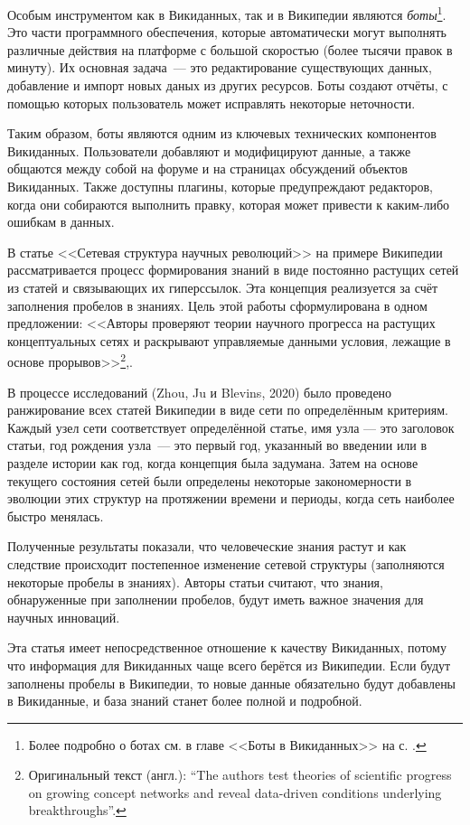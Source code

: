 Особым инструментом как в Викиданных, так и в Википедии являются \textit{боты}\footnote{Более подробно о ботах см. в главе <<Боты в Викиданных>> на с. \pageref{ch:bots}.}. Это части программного обеспечения, которые автоматически могут выполнять различные действия на платформе с большой скоростью (более тысячи правок в минуту). Их основная задача~--- это редактирование существующих данных, добавление и импорт новых даных из других ресурсов. Боты создают отчёты, с помощью которых пользователь может исправлять некоторые неточности. 

Таким образом, боты являются одним из ключевых технических компонентов Викиданных. Пользователи добавляют и модифицируют данные, а также общаются между собой на форуме и на страницах обсуждений объектов Викиданных. Также доступны плагины, которые предупреждают редакторов, когда они собираются выполнить правку, которая может привести к каким-либо ошибкам в данных.

В статье <<Сетевая структура научных революций>>\autocite{Network_structure_revolutions} на примере Википедии рассматривается процесс формирования знаний в виде постоянно растущих сетей из статей и связывающих их гиперссылок. Эта концепция реализуется за счёт заполнения пробелов в знаниях. Цель этой работы сформулирована в одном предложении: <<Авторы проверяют теории научного прогресса на растущих концептуальных сетях и раскрывают управляемые данными условия, лежащие в основе прорывов>>\footnote{Оригинальный текст (англ.):  ``The authors test theories of scientific progress on growing concept networks and reveal data-driven conditions underlying breakthroughs''.},\autocite{Network_structure_revolutions}.

В процессе исследований (Zhou, Ju и Blevins, 2020)\autocite{Network_structure_revolutions}  было проведено ранжирование всех статей Википедии в виде сети по определённым критериям. Каждый узел сети соответствует определённой статье, имя узла --- это заголовок статьи, год рождения узла~--- это первый год, указанный во введении или в разделе истории как год, когда концепция была задумана. Затем на основе текущего состояния сетей были определены некоторые закономерности в эволюции этих структур на протяжении времени и периоды, когда сеть наиболее быстро менялась.

Полученные результаты показали, что человеческие знания растут и как следствие происходит постепенное изменение сетевой структуры (заполняются некоторые пробелы в знаниях). Авторы статьи\autocite{Network_structure_revolutions} считают, что знания, обнаруженные при заполнении пробелов, будут иметь важное значения для научных инноваций. 

Эта статья\autocite{Network_structure_revolutions} имеет непосредственное отношение к качеству Викиданных, потому что информация для Викиданных чаще всего берётся из Википедии. Если будут заполнены пробелы в Википедии, то новые данные обязательно будут добавлены в Викиданные, и база знаний станет более полной и подробной.
